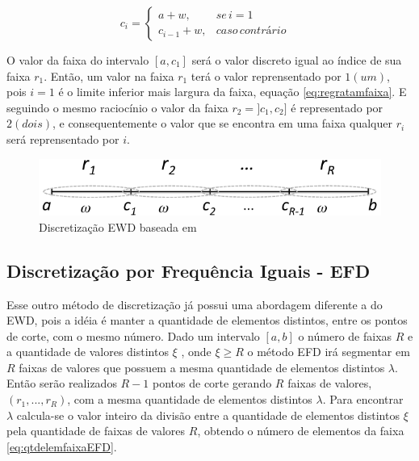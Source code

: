 \begin{equation}
c_i=\left\{\begin{matrix}
a+w, & se\, i=1 & \\ 
c_{i-1}+w,  & caso\, contrário & 
\end{matrix}\right.
 \label{eq:regratamfaixa}
\end{equation}

O valor da faixa do intervalo ${[a,c_1]}$ será o valor discreto igual ao índice de sua faixa ${r_1}$. Então, um valor na faixa ${r_1}$ terá o valor reprensentado por ${1(um)}$, pois  ${i=1}$ é o limite inferior mais largura da faixa, equação \ref{eq:regratamfaixa}. E seguindo o mesmo raciocínio o valor da faixa ${r_2=]c_1,c_2]}$ é representado por ${2(dois)}$, e consequentemente o valor que se encontra em uma faixa qualquer ${r_i}$ será reprensentado por ${i}$.

\begin{figure}[h] 
        \centering
        \includegraphics[scale=0.6]{figs/discretizacaoEWD.png}
        \caption[Discretização EWD]{Discretização EWD baseada em \cite{LOPES2014}}%
        \label{fig:faixasEWD}
\end{figure}



\subsection{Discretização por Frequência Iguais - EFD}\label{cap:refTeor:subsec:efd}

Esse outro método de discretização já possui uma abordagem diferente a do EWD, pois a idéia é manter a quantidade de elementos distintos, entre os pontos de corte, com o mesmo número. Dado um intervalo ${[a,b]}$ o número de faixas ${R}$ e a quantidade de valores distintos ${\xi}$ , onde ${\xi \geqslant R}$ o método EFD irá segmentar em  ${R}$ faixas de valores que possuem a mesma quantidade de elementos distintos ${\lambda}$. Então serão realizados ${R-1}$ pontos de corte gerando ${R}$ faixas de valores, ${(r_1,...,r_R)}$, com a mesma quantidade de elementos distintos ${\lambda}$. Para encontrar ${\lambda}$ calcula-se o valor inteiro da divisão entre a quantidade de elementos distintos ${\xi}$ pela quantidade de faixas de valores ${R}$, obtendo o número de elementos da faixa \ref{eq:qtdelemfaixaEFD}.

